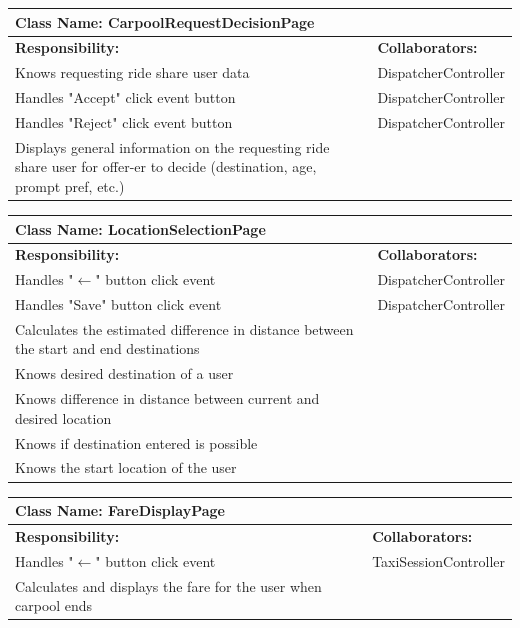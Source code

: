 \documentclass[]{article}
\begin{document}
    \begin{table}[H]
	\centering
	\begin{tabular}{|p{6cm}|p{6cm}|}
	\hline 
		\multicolumn{2}{|l|}{\textbf{Class Name: CarpoolRequestDecisionPage}} \\
	\hline
	\textbf{Responsibility:} & \textbf{Collaborators:} \\
	\hline
    Knows requesting ride share user data & DispatcherController\\ \hline
    Handles "Accept" click event button & DispatcherController\\ \hline
    Handles "Reject" click event button &DispatcherController\\ \hline
    Displays general information on the requesting ride share user for offer-er to decide (destination, age, prompt pref, etc.)& \\ \hline
	\end{tabular}
	\end{table}
    
	\begin{table}[H]
	\centering
	\begin{tabular}{|p{6cm}|p{6cm}|}
	\hline 
		\multicolumn{2}{|l|}{\textbf{Class Name: LocationSelectionPage}} \\
	\hline
	\textbf{Responsibility:} & \textbf{Collaborators:} \\
	\hline
	Handles "$\xleftarrow{}$" button click event  & DispatcherController \\ \hline
	Handles "Save" button click event  & DispatcherController\\ \hline
    Calculates the estimated difference in distance between the start and end destinations& \\ \hline 
	Knows desired destination of a user & \\ \hline
	Knows difference in distance between current and desired location & \\ \hline
	Knows if destination entered is possible & \\ \hline
    Knows the start location of the user & \\ \hline
	\end{tabular}
	\end{table}
	
	\begin{table}[H]
	\centering
	\begin{tabular}{|p{6cm}|p{6cm}|}
	\hline 
		\multicolumn{2}{|l|}{\textbf{Class Name: FareDisplayPage}} \\
	\hline
	\textbf{Responsibility:} & \textbf{Collaborators:} \\
	\hline
	Handles "$\xleftarrow{}$" button click event  & TaxiSessionController \\ \hline
	Calculates and displays the fare for the user when carpool ends & \\ \hline
	\end{tabular}
	\end{table}
	
\end{document}
